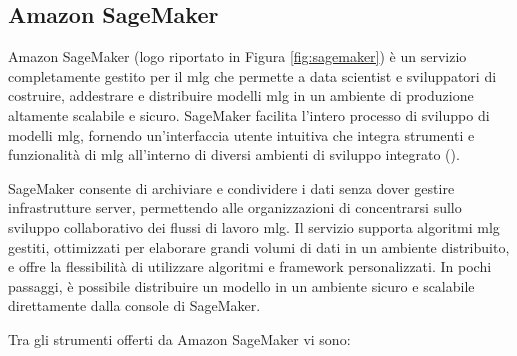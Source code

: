 \subsection{Amazon SageMaker}
Amazon SageMaker (logo riportato in Figura \ref{fig:sagemaker}) è un servizio completamente gestito per il \gls{mlg} che permette a data scientist e sviluppatori di costruire, addestrare e distribuire modelli \gls{mlg} in un ambiente di produzione altamente scalabile e sicuro. SageMaker facilita l'intero processo di sviluppo di modelli \gls{mlg}, fornendo un'interfaccia utente intuitiva che integra strumenti e funzionalità di \gls{mlg} all'interno di diversi ambienti di sviluppo integrato ().

SageMaker consente di archiviare e condividere i dati senza dover gestire infrastrutture server, permettendo alle organizzazioni di concentrarsi sullo sviluppo collaborativo dei flussi di lavoro \gls{mlg}. Il servizio supporta algoritmi \gls{mlg} gestiti, ottimizzati per elaborare grandi volumi di dati in un ambiente distribuito, e offre la flessibilità di utilizzare algoritmi e framework personalizzati. In pochi passaggi, è possibile distribuire un modello in un ambiente sicuro e scalabile direttamente dalla console di SageMaker.

Tra gli strumenti offerti da Amazon SageMaker vi sono:

